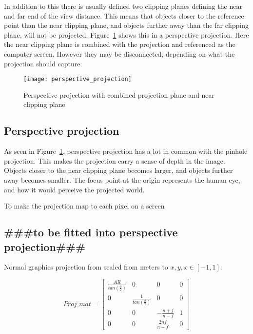 In addition to this there is usually defined two clipping planes defining the near and far end of the view distance. This means that objects closer to the reference point than the near clipping plane, and objects further away than the far clipping plane, will not be projected. Figure~\ref{fig:perspective_projection} shows this in a perspective projection. Here the near clipping plane is combined with the projection and referenced as the computer screen. However they may be disconnected, depending on what the projection should capture.

\begin{figure}[!htb]
    \centering
    \texttt{[image: perspective\_projection]}
    \caption{Perspective projection with combined projection plane and near clipping plane}
    \label{fig:perspective_projection}
\end{figure}

\subsection{Perspective projection}

As seen in Figure~\ref{fig:perspective_projection}, perspective projection has a lot in common with the pinhole projection. This makes the projection carry a sense of depth in the image. Objects closer to the near clipping plane becomes larger, and objects further away becomes smaller. The focus point at the origin represents the human eye, and how it would perceive the projected world.

To make the projection map to each pixel on a screen 

\subsection*{\#\#\#to be fitted into perspective projection\#\#\#}
Normal graphics projection from scaled from meters to $x,y,x \in [-1,1]$:

\begin{equation}
    Proj\_mat = \begin{bmatrix}
        \frac{AR}{tan(\frac{\theta}{2})}    &   0                                   &   0   &   0   \\
        0                                   &   \frac{1}{tan(\frac{\theta}{2})}    &   0   &   0   \\
        0                                   &   0                                   &   -\frac{n+f}{n-f} & 1\\
        0                                   &   0                                   &   \frac{2nf}{n-f} & 0
    \end{bmatrix}
\end{equation}

